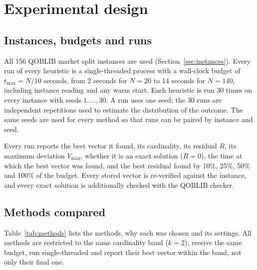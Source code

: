 \documentclass[pdflatex,sn-mathphys-num]{sn-jnl}
\theoremstyle{thmstyleone}
\theoremstyle{thmstylethree}
\begin{document}
\section{Experimental design}\label{sec:setup}

\subsection{Instances, budgets and runs}
All 156 QOBLIB market split instances are used (Section~\ref{sec:instances}). Every run of every heuristic is a single-threaded process with a wall-clock budget of $t_{\max}=N/10$ seconds, from 2 seconds for $N=20$ to 14 seconds for $N=140$, including instance reading and any warm start. Each heuristic is run 30 times on every instance with seeds $1,\dots,30$. A run uses one seed; the 30 runs are independent repetitions used to estimate the distribution of the outcome. The same seeds are used for every method so that runs can be paired by instance and seed.

Every run reports the best vector it found, its cardinality, its residual $R$, its maximum deviation $V_{\max}$, whether it is an exact solution ($R=0$), the time at which the best vector was found, and the best residual found by 10\%, 25\%, 50\% and 100\% of the budget. Every stored vector is re-verified against the instance, and every exact solution is additionally checked with the QOBLIB checker.

\subsection{Methods compared}\label{sec:competitors}
Table~\ref{tab:methods} lists the methods, why each was chosen and its settings. All methods are restricted to the same cardinality band ($k=2$), receive the same budget, run single-threaded and report their best vector within the band, not only their final one.
\end{document}
